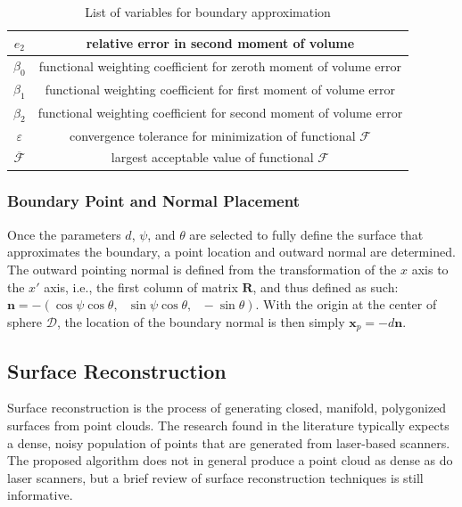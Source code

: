 \begin{table}[htbp!]
\begin{tabular}{|c||c|}
   $e_2$ & relative error in second moment of volume \\ \hline   
   $\beta_0$ & functional weighting coefficient for zeroth moment of volume error \\ \hline
   $\beta_1$ & functional weighting coefficient for first moment of volume error \\ \hline
   $\beta_2$ & functional weighting coefficient for second moment of volume error \\ \hline 
   $\varepsilon$ & convergence tolerance for minimization of functional $\mathcal{F}$ \\ \hline
   $\overline{\mathcal{F}}$ \rule{0mm}{4mm} & largest acceptable value of functional $\mathcal{F}$ \\ \hline        
\end{tabular}
\caption{List of variables for boundary approximation}
\label{tab:surface}
\end{table}

\subsubsection{Boundary Point and Normal Placement}

Once the parameters $d$, $\psi$, and $\theta$ are selected to fully define the surface that approximates the boundary, a point location and outward normal are determined. The outward pointing normal is defined from the transformation of the $x$ axis to the $x'$ axis, i.e., the first column of matrix $\bm{R}$, and thus defined as such: $\bm{n} = -(\cos\psi\cos\theta,\text{\ }\sin\psi\cos\theta,\text{\ }-\sin\theta)$. With the origin at the center of sphere $\mathcal{D}$, the location of the boundary normal is then simply $\mathbf{x}_p = -d\bm{n}$.

\subsection{Surface Reconstruction}
\label{Surface Reconstruction}

Surface reconstruction is the process of generating closed, manifold, polygonized surfaces from point clouds. The research found in the literature typically expects a dense, noisy population of points that are generated from laser-based scanners. The proposed algorithm does not in general produce a point cloud as dense as do laser scanners, but a brief review of surface reconstruction techniques is still informative.

